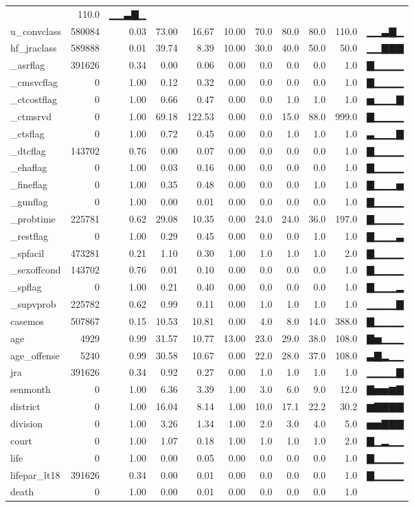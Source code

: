\documentclass[
]{article}
\begin{document}
\begin{longtable}[]{@{}lrrrrrrrrrl@{}}
& 110.0 & ▁▁▃▇▁\tabularnewline
u\_convclass & 580084 & 0.03 & 73.00 & 16.67 & 10.00 & 70.0 & 80.0 &
80.0 & 110.0 & ▁▁▃▇▁\tabularnewline
hf\_jraclass & 589888 & 0.01 & 39.74 & 8.39 & 10.00 & 30.0 & 40.0 & 50.0
& 50.0 & ▁▁▇▇▇\tabularnewline
\_asrflag & 391626 & 0.34 & 0.00 & 0.06 & 0.00 & 0.0 & 0.0 & 0.0 & 1.0 &
▇▁▁▁▁\tabularnewline
\_cmsvcflag & 0 & 1.00 & 0.12 & 0.32 & 0.00 & 0.0 & 0.0 & 0.0 & 1.0 &
▇▁▁▁▁\tabularnewline
\_ctcostflag & 0 & 1.00 & 0.66 & 0.47 & 0.00 & 0.0 & 1.0 & 1.0 & 1.0 &
▅▁▁▁▇\tabularnewline
\_ctmsrvd & 0 & 1.00 & 69.18 & 122.53 & 0.00 & 0.0 & 15.0 & 88.0 & 999.0
& ▇▁▁▁▁\tabularnewline
\_ctsflag & 0 & 1.00 & 0.72 & 0.45 & 0.00 & 0.0 & 1.0 & 1.0 & 1.0 &
▃▁▁▁▇\tabularnewline
\_dtcflag & 143702 & 0.76 & 0.00 & 0.07 & 0.00 & 0.0 & 0.0 & 0.0 & 1.0 &
▇▁▁▁▁\tabularnewline
\_ehaflag & 0 & 1.00 & 0.03 & 0.16 & 0.00 & 0.0 & 0.0 & 0.0 & 1.0 &
▇▁▁▁▁\tabularnewline
\_fineflag & 0 & 1.00 & 0.35 & 0.48 & 0.00 & 0.0 & 0.0 & 1.0 & 1.0 &
▇▁▁▁▅\tabularnewline
\_gunflag & 0 & 1.00 & 0.00 & 0.01 & 0.00 & 0.0 & 0.0 & 0.0 & 1.0 &
▇▁▁▁▁\tabularnewline
\_probtime & 225781 & 0.62 & 29.08 & 10.35 & 0.00 & 24.0 & 24.0 & 36.0 &
197.0 & ▇▁▁▁▁\tabularnewline
\_restflag & 0 & 1.00 & 0.29 & 0.45 & 0.00 & 0.0 & 0.0 & 1.0 & 1.0 &
▇▁▁▁▃\tabularnewline
\_spfacil & 473281 & 0.21 & 1.10 & 0.30 & 1.00 & 1.0 & 1.0 & 1.0 & 2.0 &
▇▁▁▁▁\tabularnewline
\_sexoffcond & 143702 & 0.76 & 0.01 & 0.10 & 0.00 & 0.0 & 0.0 & 0.0 &
1.0 & ▇▁▁▁▁\tabularnewline
\_spflag & 0 & 1.00 & 0.21 & 0.40 & 0.00 & 0.0 & 0.0 & 0.0 & 1.0 &
▇▁▁▁▂\tabularnewline
\_supvprob & 225782 & 0.62 & 0.99 & 0.11 & 0.00 & 1.0 & 1.0 & 1.0 & 1.0
& ▁▁▁▁▇\tabularnewline
casemos & 507867 & 0.15 & 10.53 & 10.81 & 0.00 & 4.0 & 8.0 & 14.0 &
388.0 & ▇▁▁▁▁\tabularnewline
age & 4929 & 0.99 & 31.57 & 10.77 & 13.00 & 23.0 & 29.0 & 38.0 & 108.0 &
▇▅▁▁▁\tabularnewline
age\_offense & 5240 & 0.99 & 30.58 & 10.67 & 0.00 & 22.0 & 28.0 & 37.0 &
108.0 & ▃▇▂▁▁\tabularnewline
jra & 391626 & 0.34 & 0.92 & 0.27 & 0.00 & 1.0 & 1.0 & 1.0 & 1.0 &
▁▁▁▁▇\tabularnewline
senmonth & 0 & 1.00 & 6.36 & 3.39 & 1.00 & 3.0 & 6.0 & 9.0 & 12.0 &
▇▅▅▆▇\tabularnewline
district & 0 & 1.00 & 16.04 & 8.14 & 1.00 & 10.0 & 17.1 & 22.2 & 30.2 &
▆▇▇▇▇\tabularnewline
division & 0 & 1.00 & 3.26 & 1.34 & 1.00 & 2.0 & 3.0 & 4.0 & 5.0 &
▅▅▇▇▇\tabularnewline
court & 0 & 1.00 & 1.07 & 0.18 & 1.00 & 1.0 & 1.0 & 1.0 & 2.0 &
▇▁▂▁▁\tabularnewline
life & 0 & 1.00 & 0.00 & 0.05 & 0.00 & 0.0 & 0.0 & 0.0 & 1.0 &
▇▁▁▁▁\tabularnewline
lifepar\_lt18 & 391626 & 0.34 & 0.00 & 0.01 & 0.00 & 0.0 & 0.0 & 0.0 &
1.0 & ▇▁▁▁▁\tabularnewline
death & 0 & 1.00 & 0.00 & 0.01 & 0.00 & 0.0 & 0.0 & 0.0 & 1.0 &

\end{longtable}
\end{document}
